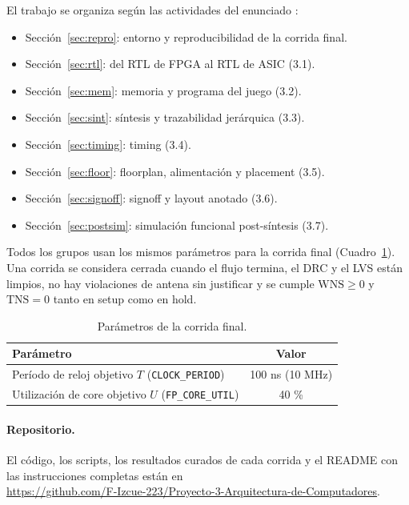 \documentclass[11pt,letterpaper]{article}
\newcommand{\code}[1]{\texttt{#1}}
\newcommand{\fuente}{\par\vspace{3pt}{\footnotesize\emph{Fuente: Elaboración propia.}}\par}
\begin{document}
El trabajo se organiza según las actividades del enunciado \cite{enunciado}:
\begin{itemize}
  \item Sección~\ref{sec:repro}: entorno y reproducibilidad de la corrida final.
  \item Sección~\ref{sec:rtl}: del RTL de FPGA al RTL de ASIC (3.1).
  \item Sección~\ref{sec:mem}: memoria y programa del juego (3.2).
  \item Sección~\ref{sec:sint}: síntesis y trazabilidad jerárquica (3.3).
  \item Sección~\ref{sec:timing}: timing (3.4).
  \item Sección~\ref{sec:floor}: floorplan, alimentación y placement (3.5).
  \item Sección~\ref{sec:signoff}: signoff y layout anotado (3.6).
  \item Sección~\ref{sec:postsim}: simulación funcional post-síntesis (3.7).
\end{itemize}

Todos los grupos usan los mismos parámetros para la corrida final (Cuadro~\ref{tab:params}). Una corrida se considera cerrada cuando el flujo termina, el DRC y el LVS están limpios, no hay violaciones de antena sin justificar y se cumple $\mathrm{WNS}\geq 0$ y $\mathrm{TNS}=0$ tanto en setup como en hold.

\begin{table}[H]
\centering
\caption{Parámetros de la corrida final.}
\label{tab:params}
\begin{tabular}{lc}
\toprule
\textbf{Parámetro} & \textbf{Valor}\\
\midrule
Período de reloj objetivo $T$ (\code{CLOCK\_PERIOD}) & 100 ns (10 MHz)\\
Utilización de core objetivo $U$ (\code{FP\_CORE\_UTIL}) & 40 \%\\
\bottomrule
\end{tabular}
\fuente
\end{table}

\paragraph{Repositorio.} El código, los scripts, los resultados curados de cada corrida y el README con las instrucciones completas están en \\\url{https://github.com/F-Izcue-223/Proyecto-3-Arquitectura-de-Computadores}.

\end{document}
